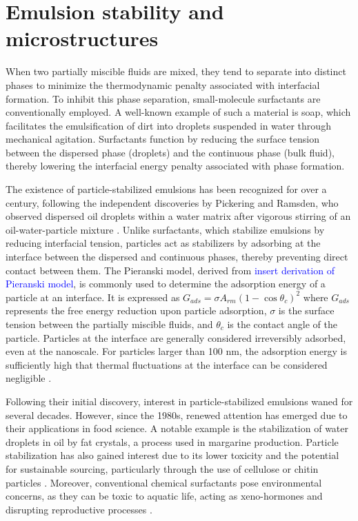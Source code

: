 \section{Emulsion stability and microstructures}

When two partially miscible fluids are mixed, they tend to separate into distinct phases to minimize the thermodynamic penalty associated with interfacial formation. 
To inhibit this phase separation, small-molecule surfactants are conventionally employed. A well-known example of such a material is soap, which facilitates the 
emulsification of dirt into droplets suspended in water through mechanical agitation. Surfactants function by reducing the surface tension between the dispersed 
phase (droplets) and the continuous phase (bulk fluid), thereby lowering the interfacial energy penalty associated with phase formation.

The existence of particle-stabilized emulsions has been recognized for over a century, following the independent discoveries by Pickering and Ramsden, who observed dispersed 
oil droplets within a water matrix after vigorous stirring of an oil-water-particle mixture \cite{ramsden_separation_1904, pickering_cxcvi.emulsions_1907}. Unlike surfactants, 
which stabilize emulsions by reducing interfacial tension, particles act as stabilizers by adsorbing at the interface between the dispersed and continuous phases, thereby 
preventing direct contact between them. The Pieranski model, derived from \textcolor{blue}{insert derivation of Pieranski model}, is commonly used to determine the adsorption 
energy of a particle at an interface. It is expressed as $ G_{ads} = \sigma A_{rm} (1 - \cos{\theta_c})^2 $ where $G_{ads}$ represents the free energy reduction upon particle 
adsorption, $\sigma$ is the surface tension between the partially miscible fluids, and $ \theta_c $ is the contact angle of the particle. Particles at the interface are 
generally considered irreversibly adsorbed, even at the nanoscale. For particles larger than 100 nm, the adsorption energy is sufficiently high that thermal fluctuations at 
the interface can be considered negligible \cite{cheung_molecular_2011}.

Following their initial discovery, interest in particle-stabilized emulsions waned for several decades. However, since the 1980s, renewed attention has emerged due to 
their applications in food science. A notable example is the stabilization of water droplets in oil by fat crystals, a process used in margarine production. Particle 
stabilization has also gained interest due to its lower toxicity and the potential for sustainable sourcing, particularly through the use of cellulose or chitin 
particles \cite{fujisawa_nanocellulose-stabilized_2017, tang_stimuli-responsive_2016, kalliola_carboxymethyl_2018}. Moreover, conventional chemical surfactants pose 
environmental concerns, as they can be toxic to aquatic life, acting as xeno-hormones and disrupting reproductive processes 
\cite{kaczerewska_environmental_2020, lechuga_acute_2016}.

